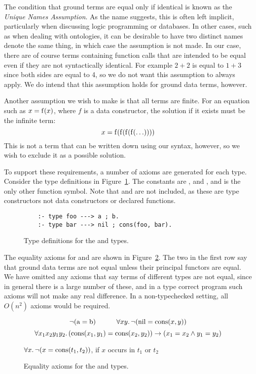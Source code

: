 The condition that ground terms are equal only if identical
is known as the \emph{Unique Names Assumption\label{gi:una}}.
As the name suggests, this is often left implicit,
particularly when discussing logic programming or databases.
In other cases, such as when dealing with ontologies,
it can be desirable to have two distinct names denote the same thing,
in which case the assumption is not made.
In our case,
there are of course terms containing function calls
that are intended to be equal even if they are not syntactically identical.
For example $2 + 2$ is equal to $1 + 3$
since both sides are equal to 4,
so we do not want this assumption to always apply.
We do intend that this assumption holds for ground data terms, however.

Another assumption we wish to make is that all terms are finite.
For an equation such as $x = \operatorname{f}(x)$,
where $f$ is a data constructor,
the solution if it exists must be the infinite term:
\[ x = \operatorname{f}(\operatorname{f}(\operatorname{f}(\operatorname{f}(\ldots)))) \]
This is not a term that can be written down using our syntax, however,
so we wish to exclude it as a possible solution.

To support these requirements,
a number of axioms are generated for each type.
Consider the type definitions in Figure~\ref{fig:decl-foobar}.
The constants are ,  and ,
and  is the only other function symbol.
Note that  and  are not included,
as these are type constructors not data constructors
or declared functions.

\begin{figure}
\begin{verbatim}
    :- type foo ---> a ; b.
    :- type bar ---> nil ; cons(foo, bar).
\end{verbatim}
\caption{Type definitions for the  and  types.
\label{fig:decl-foobar}}
\end{figure}

The equality axioms for  and 
are shown in Figure~\ref{fig:ax-foobar}.
The two in the first row say that
ground data terms are not equal
unless their principal functors are equal.
We have omitted any axioms that say
terms of different types are not equal,
since in general there is a large number of these,
and in a type correct program
such axioms will not make any real difference.
In a non-typechecked setting,
all $O(n^2)$ axioms would be required.

\begin{figure}
\[
    \lnot (\operatorname{a} = \operatorname{b})
    \qquad\quad
    \forall x y.\, \lnot (\operatorname{nil} = \operatorname{cons}(x, y))
\]
\[
    \forall x_1 x_2 y_1 y_2.\,
    (\operatorname{cons}(x_1, y_1) = \operatorname{cons}(x_2, y_2))
    \rightarrow
    (x_1 = x_2 \land y_1 = y_2)
\]
\begin{center}
$\forall x.\, \lnot (x = \operatorname{cons}(t_1, t_2))$,
if $x$ occurs in $t_1$ or $t_2$
\end{center}
\caption{Equality axioms for the  and  types.
\label{fig:ax-foobar}}
\end{figure}

